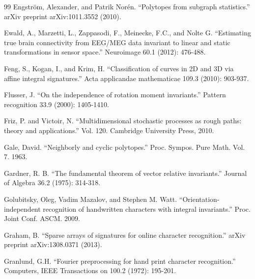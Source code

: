 \documentclass{scrartcl}
\theoremstyle{plain}
\theoremstyle{definition}
\newcommand{\1}[1]{1_{\{#1\}}}
\begin{document}
\begin{thebibliography}{99}
    Engstr\"om, Alexander, and Patrik Nor\'en. ``Polytopes from subgraph statistics.'' arXiv preprint arXiv:1011.3552 (2010).

    Ewald, A., Marzetti, L., Zappasodi, F., Meinecke, F.C., and Nolte G.
    ``Estimating true brain connectivity from EEG/MEG data invariant to linear
    and static transformations in sensor space.'' Neuroimage 60.1 (2012):
    476-488.

    Feng, S., Kogan, I., and Krim, H. ``Classification of curves in 2D and 3D via affine integral signatures.'' Acta applicandae mathematicae 109.3 (2010): 903-937.

    Flusser, J. ``On the independence of rotation moment invariants.'' Pattern recognition 33.9 (2000): 1405-1410.

    Friz, P. and Victoir, N. ``Multidimensional stochastic processes as rough paths: theory and applications.'' Vol. 120. Cambridge University Press, 2010.

    Gale, David. ``Neighborly and cyclic polytopes.'' Proc. Sympos. Pure Math. Vol. 7. 1963.

    Gardner, R. B. ``The fundamental theorem of vector relative invariants.'' Journal of Algebra 36.2 (1975): 314-318.

    Golubitsky, Oleg, Vadim Mazalov, and Stephen M. Watt.
    ``Orientation-independent recognition of handwritten characters with
    integral invariants.'' Proc. Joint Conf. ASCM. 2009.

    Graham, B. ``Sparse arrays of signatures for online character recognition.'' arXiv preprint arXiv:1308.0371 (2013).

    Granlund, G.H. ``Fourier preprocessing for hand print character recognition.'' Computers, IEEE Transactions on 100.2 (1972): 195-201.



\end{thebibliography}
\end{document}
